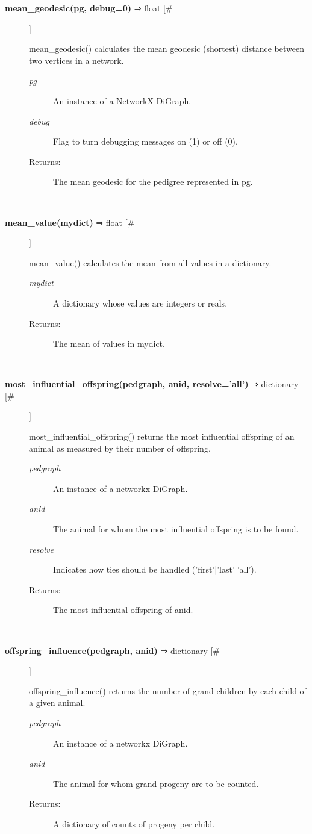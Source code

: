 \documentclass{article}
\begin{document}
\begin{description}
\item[\textbf{mean\_geodesic(pg, debug=0)} ⇒ float [\#]
]
\par mean\_geodesic() calculates the mean geodesic (shortest) distance
between two vertices in a network.
\begin{description}
\item[\textit{pg}
]
An instance of a NetworkX DiGraph.
\item[\textit{debug}
]
Flag to turn debugging messages on (1) or off (0).
\item[Returns:
]
The mean geodesic for the pedigree represented in pg.
\end{description}\\

\item[\textbf{mean\_value(mydict)} ⇒ float [\#]
]
\par mean\_value() calculates the mean from all values in a dictionary.
\begin{description}
\item[\textit{mydict}
]
A dictionary whose values are integers or reals.
\item[Returns:
]
The mean of values in mydict.
\end{description}\\

\item[\textbf{most\_influential\_offspring(pedgraph, anid, resolve='all')} ⇒ dictionary [\#]
]
\par most\_influential\_offspring() returns the most influential offspring of an animal as measured by their number of offspring.
\begin{description}
\item[\textit{pedgraph}
]
An instance of a networkx DiGraph.
\item[\textit{anid}
]
The animal for whom the most influential offspring is to be found.
\item[\textit{resolve}
]
Indicates how ties should be handled ('first'|'last'|'all').
\item[Returns:
]
The most influential offspring of anid.
\end{description}\\

\item[\textbf{offspring\_influence(pedgraph, anid)} ⇒ dictionary [\#]
]
\par offspring\_influence() returns the number of grand-children by each child of a given animal.
\begin{description}
\item[\textit{pedgraph}
]
An instance of a networkx DiGraph.
\item[\textit{anid}
]
The animal for whom grand-progeny are to be counted.
\item[Returns:
]
A dictionary of counts of progeny per child.
\end{description}\\


\end{description}
\end{document}
